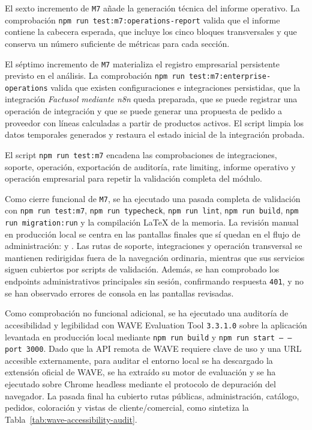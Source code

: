 El sexto incremento de \texttt{M7} añade la generación técnica del informe operativo. La comprobación \texttt{npm run test:m7:operations-report} valida que el informe contiene la cabecera esperada, que incluye los cinco bloques transversales y que conserva un número suficiente de métricas para cada sección.

El séptimo incremento de \texttt{M7} materializa el registro empresarial persistente previsto en el análisis. La comprobación \texttt{npm run test:m7:enterprise-operations} valida que existen configuraciones e integraciones persistidas, que la integración \textit{Factusol mediante n8n} queda preparada, que se puede registrar una operación de integración y que se puede generar una propuesta de pedido a proveedor con líneas calculadas a partir de productos activos. El script limpia los datos temporales generados y restaura el estado inicial de la integración probada.

El script \texttt{npm run test:m7} encadena las comprobaciones de integraciones, soporte, operación, exportación de auditoría, rate limiting, informe operativo y operación empresarial para repetir la validación completa del módulo.

Como cierre funcional de \texttt{M7}, se ha ejecutado una pasada completa de validación con \texttt{npm run test:m7}, \texttt{npm run typecheck}, \texttt{npm run lint}, \texttt{npm run build}, \texttt{npm run migration:run} y la compilación \LaTeX{} de la memoria. La revisión manual en producción local se centra en las pantallas finales que sí quedan en el flujo de administración:  y . Las rutas de soporte, integraciones y operación transversal se mantienen redirigidas fuera de la navegación ordinaria, mientras que sus servicios siguen cubiertos por scripts de validación. Además, se han comprobado los endpoints administrativos principales sin sesión, confirmando respuesta \texttt{401}, y no se han observado errores de consola en las pantallas revisadas.

Como comprobación no funcional adicional, se ha ejecutado una auditoría de accesibilidad y legibilidad con WAVE Evaluation Tool \texttt{3.3.1.0} sobre la aplicación levantada en producción local mediante \texttt{npm run build} y \texttt{npm run start -- --port 3000}. Dado que la API remota de WAVE requiere clave de uso y una URL accesible externamente, para auditar el entorno local se ha descargado la extensión oficial de WAVE, se ha extraído su motor de evaluación y se ha ejecutado sobre Chrome headless mediante el protocolo de depuración del navegador. La pasada final ha cubierto rutas públicas, administración, catálogo, pedidos, coloración y vistas de cliente/comercial, como sintetiza la Tabla~\ref{tab:wave-accessibility-audit}.

